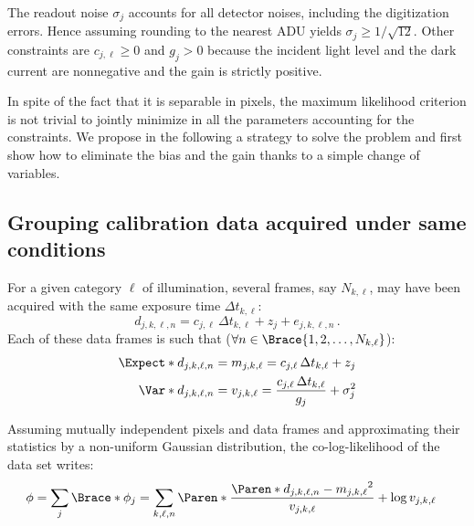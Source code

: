 \documentclass[a4paper,11pt,twoside]{scrartcl}
\theoremstyle{plain} %
\theoremstyle{definition}
\theoremstyle{remark}
\begin{document}
The readout noise $\sigma_j$ accounts for all detector noises, including the
digitization errors.  Hence assuming rounding to the nearest ADU yields
$\sigma_j ≥ 1/\sqrt{12}$.  Other constraints are $c_{j,\ell} ≥ 0$ and $g_j > 0$
because the incident light level and the dark current are nonnegative and the
gain is strictly positive.

In spite of the fact that it is separable in pixels, the maximum likelihood
criterion is not trivial to jointly minimize in all the parameters accounting
for the constraints.  We propose in the following a strategy to solve the
problem and first show how to eliminate the bias and the gain thanks to a
simple change of variables.


\subsection{Grouping calibration data acquired under same conditions}

For a given category $\ell$ of illumination, several frames, say $N_{k,\ell}$,
may have been acquired with the same exposure time $\Delta t_{k,\ell}$:
\begin{equation}
  d_{j,k,\ell,n} = c_{j,\ell}\,\Delta t_{k,\ell} + z_j + e_{j,k,\ell,n} \, .
\end{equation}
Each of these data frames is such that ($\forall n \in
\Brace{1,2,\ldots,N_{k,\ell}}$):
\begin{align}
  \Expect*{d_{j,k,\ell,n}} &= m_{j,k,\ell} = c_{j,\ell}\,\Delta t_{k,\ell} + z_j\\
  \Var*{d_{j,k,\ell,n}}
   &= v_{j,k,\ell}
   = \frac{c_{j,\ell}\,\Delta t_{k,\ell}}{g_j} + \sigma_j^2
\end{align}

Assuming mutually independent pixels and data frames and approximating their
statistics by a non-uniform Gaussian distribution, the co-log-likelihood of the
data set writes:
\begin{align}
  \phi &= \sum_{j} \Brace*{
    \phi_j =
    \sum_{k,\ell,n} \Paren*{
      \frac{\Paren*{d_{j,k,\ell,n} - m_{j,k,\ell}}^2}{v_{j,k,\ell}}
      + \log v_{j,k,\ell}
    }
  }
\end{align}
\end{document}
